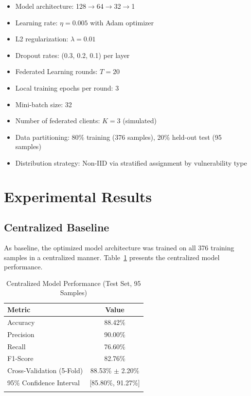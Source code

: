 \documentclass[pdflatex,sn-mathphys-num]{sn-jnl}
\theoremstyle{thmstyleone}%
\theoremstyle{thmstyletwo}%
\theoremstyle{thmstylethree}%
\begin{document}
\begin{itemize}
    \item Model architecture: 128$\rightarrow$64$\rightarrow$32$\rightarrow$1
    \item Learning rate: $\eta = 0.005$ with Adam optimizer
    \item L2 regularization: $\lambda = 0.01$
    \item Dropout rates: (0.3, 0.2, 0.1) per layer
    \item Federated Learning rounds: $T = 20$
    \item Local training epochs per round: 3
    \item Mini-batch size: 32
    \item Number of federated clients: $K = 3$ (simulated)
    \item Data partitioning: 80\% training (376 samples), 20\% held-out test (95 samples)
    \item Distribution strategy: Non-IID via stratified assignment by vulnerability type
\end{itemize}


\section{Experimental Results}\label{sec:results}

\subsection{Centralized Baseline}\label{subsec:baseline}

As baseline, the optimized model architecture was trained on all 376 training samples in a centralized manner. Table~\ref{tab:centralized} presents the centralized model performance.

\begin{table}[h]
\caption{Centralized Model Performance (Test Set, 95 Samples)}\label{tab:centralized}
\begin{tabular}{lc}
\toprule
\textbf{Metric} & \textbf{Value} \\ 
\midrule
Accuracy & 88.42\% \\
Precision & 90.00\% \\
Recall & 76.60\% \\
F1-Score & 82.76\% \\
\midrule
Cross-Validation (5-Fold) & 88.53\% $\pm$ 2.20\% \\
95\% Confidence Interval & [85.80\%, 91.27\%] \\
\botrule
\end{tabular}
\end{table}
\end{document}
